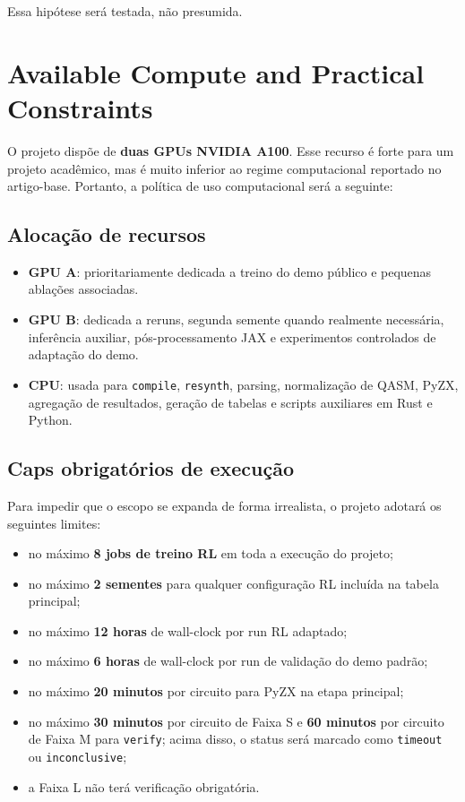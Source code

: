 \documentclass[a4paper,11pt]{article}
\begin{document}
Essa hipótese será testada, não presumida.

\section{Available Compute and Practical Constraints}

O projeto dispõe de \textbf{duas GPUs NVIDIA A100}. Esse recurso é forte para um projeto acadêmico, mas é muito inferior ao regime computacional reportado no artigo-base. Portanto, a política de uso computacional será a seguinte:

\subsection*{Alocação de recursos}

\begin{itemize}
  \item \textbf{GPU A}: prioritariamente dedicada a treino do demo público e pequenas ablações associadas.
  \item \textbf{GPU B}: dedicada a reruns, segunda semente quando realmente necessária, inferência auxiliar, pós-processamento JAX e experimentos controlados de adaptação do demo.
  \item \textbf{CPU}: usada para \texttt{compile}, \texttt{resynth}, parsing, normalização de QASM, PyZX, agregação de resultados, geração de tabelas e scripts auxiliares em Rust e Python.
\end{itemize}

\subsection*{Caps obrigatórios de execução}

Para impedir que o escopo se expanda de forma irrealista, o projeto adotará os seguintes limites:
\begin{itemize}
  \item no máximo \textbf{8 jobs de treino RL} em toda a execução do projeto;
  \item no máximo \textbf{2 sementes} para qualquer configuração RL incluída na tabela principal;
  \item no máximo \textbf{12 horas} de wall-clock por run RL adaptado;
  \item no máximo \textbf{6 horas} de wall-clock por run de validação do demo padrão;
  \item no máximo \textbf{20 minutos} por circuito para PyZX na etapa principal;
  \item no máximo \textbf{30 minutos} por circuito de Faixa S e \textbf{60 minutos} por circuito de Faixa M para \texttt{verify}; acima disso, o status será marcado como \texttt{timeout} ou \texttt{inconclusive};
  \item a Faixa L não terá verificação obrigatória.
\end{itemize}
\end{document}
